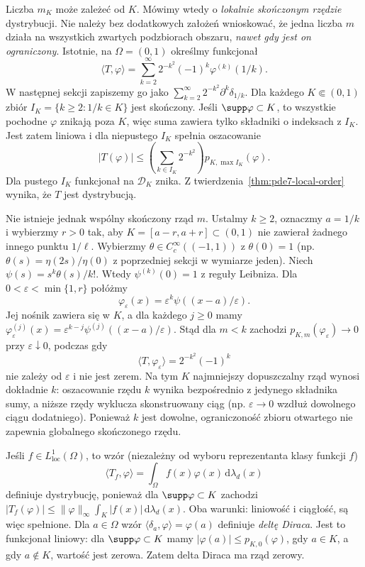 Liczba $m_K$ może zależeć od $K$. Mówimy wtedy o \emph{lokalnie
skończonym rzędzie} dystrybucji. Nie należy bez dodatkowych założeń
wnioskować, że jedna liczba $m$ działa na wszystkich zwartych
podzbiorach obszaru, \emph{nawet gdy jest on ograniczony}.
Istotnie, na $\Omega=(0,1)$ określmy funkcjonał
\[
 \langle T,\varphi\rangle
 =\sum_{k=2}^\infty 2^{-k^2}(-1)^k\varphi^{(k)}(1/k).
\]
W następnej sekcji zapiszemy go jako
$\sum_{k=2}^\infty 2^{-k^2}\partial^k\delta_{1/k}$.
Dla każdego $K\Subset(0,1)$ zbiór
$I_K=\{k\ge2:1/k\in K\}$ jest skończony.
Jeśli $\supp\varphi\subset K$, to wszystkie pochodne
$\varphi$ znikają poza $K$, więc suma zawiera tylko
składniki o indeksach z $I_K$. Jest zatem liniowa
i dla niepustego $I_K$ spełnia oszacowanie
\[
 |T(\varphi)|\le
 \left(\sum_{k\in I_K}2^{-k^2}\right)
 p_{K,\max I_K}(\varphi).
\]
Dla pustego $I_K$ funkcjonał na $\mathcal D_K$ znika.
Z twierdzenia~\ref{thm:pde7-local-order} wynika, że
$T$ jest dystrybucją.

Nie istnieje jednak wspólny skończony rząd $m$.
Ustalmy $k\ge2$, oznaczmy $a=1/k$ i wybierzmy
$r>0$ tak, aby $K=[a-r,a+r]\subset(0,1)$
nie zawierał żadnego innego punktu $1/\ell$.
Wybierzmy $\theta\in C_c^\infty((-1,1))$ z $\theta(0)=1$
(np. $\theta(s)=\eta(2s)/\eta(0)$
z poprzedniej sekcji w wymiarze jeden). Niech
$\psi(s)=s^k\theta(s)/k!$.
Wtedy $\psi^{(k)}(0)=1$ z reguły Leibniza.
Dla $0<\varepsilon<\min\{1,r\}$ połóżmy
\[
 \varphi_\varepsilon(x)=\varepsilon^k
 \psi((x-a)/\varepsilon).
\]
Jej nośnik zawiera się w $K$, a dla każdego $j\ge0$
mamy $\varphi_\varepsilon^{(j)}(x)=
\varepsilon^{k-j}\psi^{(j)}((x-a)/\varepsilon)$.
Stąd dla $m<k$ zachodzi
$p_{K,m}(\varphi_\varepsilon)\to0$ przy
$\varepsilon\downarrow0$, podczas gdy
\[
 \langle T,\varphi_\varepsilon\rangle
 =2^{-k^2}(-1)^k
\]
nie zależy od $\varepsilon$ i nie jest zerem.
Na tym $K$ najmniejszy dopuszczalny rząd wynosi
dokładnie $k$: oszacowanie rzędu $k$ wynika
bezpośrednio z jedynego składnika sumy, a niższe
rzędy wyklucza skonstruowany ciąg (np. $\varepsilon\to0$
wzdłuż dowolnego ciągu dodatniego).
Ponieważ $k$ jest dowolne, ograniczoność zbioru
otwartego nie zapewnia globalnego skończonego rzędu.

\begin{przyklad}
\label{ex:pde7-regular}
Jeśli $f\in L^1_{\mathrm{loc}}(\Omega)$, to wzór (niezależny od wyboru reprezentanta klasy funkcji $f$)
\begin{equation}\label{eq:pde7-regular}
 \langle T_f,\varphi\rangle
 =\int_\Omega f(x)\varphi(x)\,\mathrm d\lambda_d(x)
\end{equation}
definiuje dystrybucję, ponieważ dla $\supp\varphi\subset K$ zachodzi
$|T_f(\varphi)|\le\|\varphi\|_\infty\int_K|f(x)|\,\mathrm d\lambda_d(x)$.
Oba warunki: liniowość i ciągłość, są więc spełnione.
Dla $a\in\Omega$ wzór $\langle\delta_a,\varphi\rangle=\varphi(a)$
definiuje \emph{deltę Diraca}. Jest to funkcjonał liniowy:
dla $\supp\varphi\subset K$ mamy
$|\varphi(a)|\le p_{K,0}(\varphi)$, gdy $a\in K$,
a gdy $a\notin K$, wartość jest zerowa.
Zatem delta Diraca ma rząd zerowy.
\end{przyklad}

